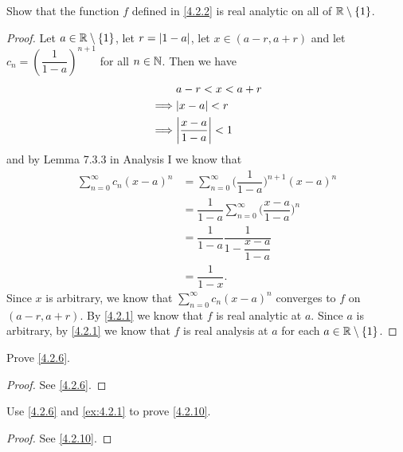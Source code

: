 \begin{ex}\label{ex:4.2.2}
  Show that the function \(f\) defined in \cref{4.2.2} is real analytic on all of \(\mathbb{R} \setminus \left\lbrace1\right\rbrace\).
\end{ex}

\begin{proof}
  Let \(a \in \mathbb{R} \setminus \left\lbrace1\right\rbrace\), let \(r = \left\lvert1 - a\right\rvert\), let \(x \in (a - r, a + r)\) and let \(c_n = (\dfrac{1}{1 - a})^{n + 1}\) for all \(n \in \mathbb{N}\).
  Then we have
  \begin{align*}
             & a - r < x < a + r              \\
    \implies & \abs{x - a} < r                \\
    \implies & \abs{\dfrac{x - a}{1 - a}} < 1
  \end{align*}
  and by Lemma 7.3.3 in Analysis I we know that
  \begin{align*}
    \sum_{n = 0}^\infty c_n (x - a)^n & = \sum_{n = 0}^\infty \bigg(\dfrac{1}{1 - a}\bigg)^{n + 1} (x - a)^n      \\
                                      & = \dfrac{1}{1 - a} \sum_{n = 0}^\infty \bigg(\dfrac{x - a}{1 - a}\bigg)^n \\
                                      & = \dfrac{1}{1 - a} \dfrac{1}{1 - \dfrac{x - a}{1 - a}}                    \\
                                      & = \dfrac{1}{1 - x}.
  \end{align*}
  Since \(x\) is arbitrary, we know that \(\sum_{n = 0}^\infty c_n (x - a)^n\) converges to \(f\) on \((a - r, a + r)\).
  By \cref{4.2.1} we know that \(f\) is real analytic at \(a\).
  Since \(a\) is arbitrary, by \cref{4.2.1} we know that \(f\) is real analysis at \(a\) for each \(a \in \mathbb{R} \setminus \left\lbrace1\right\rbrace\).
\end{proof}

\begin{ex}\label{ex:4.2.3}
  Prove \cref{4.2.6}.
\end{ex}

\begin{proof}
  See \cref{4.2.6}.
\end{proof}

\begin{ex}\label{ex:4.2.4}
  Use \cref{4.2.6} and \cref{ex:4.2.1} to prove \cref{4.2.10}.
\end{ex}

\begin{proof}
  See \cref{4.2.10}.
\end{proof}

